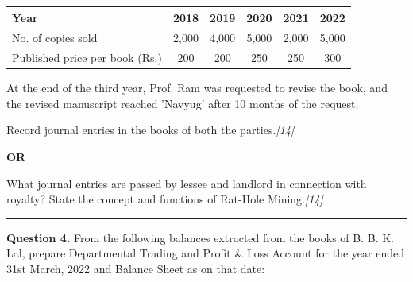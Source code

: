 \documentclass[11pt,a4paper]{article}
\newcommand{\pts}[1]{\hfill   \textit{[#1]}}
\begin{document}
\begin{center}
\small

\begin{tabular}{|l|c|c|c|c|c|}
\hline
   \textbf{Year} &   \textbf{2018} &   \textbf{2019} &   \textbf{2020} &   \textbf{2021} &   \textbf{2022} \\
\hline
No. of copies sold & 2,000 & 4,000 & 5,000 & 2,000 & 5,000 \\
Published price per book (Rs.) & 200 & 200 & 250 & 250 & 300 \\
\hline
\end{tabular}
\end{center}

At the end of the third year, Prof. Ram was requested to revise the book, and the revised manuscript reached 'Navyug' after 10 months of the request.

Record journal entries in the books of both the parties.\pts{14}

\centerline{   \textbf{OR}}

What journal entries are passed by lessee and landlord in connection with royalty? State the concept and functions of Rat-Hole Mining.\pts{14}

\medskip\rule{\linewidth}{0.2pt}

\pagebreak




\noindent   \textbf{Question 4.}
From the following balances extracted from the books of B. B. K. Lal, prepare Departmental Trading and Profit \& Loss Account for the year ended 31st March, 2022 and Balance Sheet as on that date:
\end{document}

